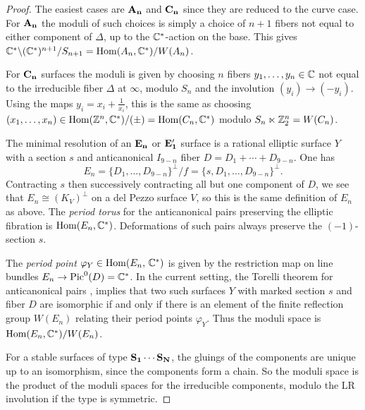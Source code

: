 \documentclass[table,x11names]{amsart}
\begin{document}
\begin{proof} The easiest cases are ${\bf A_n}$ and ${\bf C_n}$ since they are
  reduced to the curve case.
  For ${\bf A_n}$ the
  moduli of such choices is simply a choice of $n+1$ fibers not equal
  to either component of $\Delta$, up to the $\mathbb{C}^*$-action on the
  base. This gives ${\mathbb C}^*\backslash ({\mathbb C}^*)^{n+1} / S_{n+1}= \operatorname{Hom}(A_n,{\mathbb C}^*) /
  W(A_n)$. 

  For ${\bf C_n}$ surfaces the moduli is given by choosing
  $n$ fibers $y_1,\dotsc, y_n\in{\mathbb C}$ not equal to the irreducible
  fiber $\Delta$ at $\infty$, modulo $S_n$ and the involution
  $(y_i)\to (-y_i)$. Using the maps $y_i = x_i + \frac1{x_i}$, this is
  the same as choosing
  $(x_1, \dotsc, x_n) \in \operatorname{Hom}({\mathbb Z}^n,{\mathbb C}^*) / (\pm) = \operatorname{Hom}(C_n,
  {\mathbb C}^*)$ modulo $S_n\ltimes{\mathbb Z}_2^n = W(C_n)$.

  The minimal resolution of an ${\bf E_n}$ or ${\bf E_1'}$ surface is a
  rational elliptic surface $Y$ with a section $s$ and anticanonical
  $I_{9-n}$ fiber $D= D_1+\cdots + D_{9-n}$.  One has
  \begin{displaymath}
  E_n=\{D_1,\dots,D_{9-n}\}^\perp/f = \{s,D_1,\dots,D_{9-n}\}^\perp.
  \end{displaymath}
  Contracting $s$ then
  successively contracting all but one component of $D$, we see that
  $E_n\cong (K_V)^\perp$ on a del Pezzo surface $V$, so this is the
  same definition of $E_n$ as above.  
  The \emph{period torus} for the anticanonical pairs preserving the
  elliptic fibration is $\operatorname{Hom}(E_n, {\mathbb C}^*)$. 
  Deformations of such pairs always preserve the $(-1)$-section
  $s$. 

  The {\it period point} $\varphi_Y\in \operatorname{Hom}(E_n,\,\mathbb{C}^*)$ is given by
  the restriction map on line bundles $E_n \to \operatorname{Pic}^0(D)= \mathbb{C}^*$.  In
  the current setting, the Torelli theorem for anticanonical pairs
  \cite[Thm.1.8]{gross2015moduli-of-surfaces},
  \cite[Thm.8.7]{friedman2015on-the-geometry} implies that two such
  surfaces $Y$ with marked section $s$ and fiber $D$ are isomorphic if
  and only if there is an element of the finite reflection group
  $W(E_n)$ relating their period points $\varphi_Y$. Thus the moduli
  space is $\operatorname{Hom}(E_n ,\mathbb{C}^*)/ W(E_n)$.

  For a stable surfaces of type ${\bf S_1\cdots S_N}$, the
  gluings of the components are unique up to an isomorphism, since the
  components form a chain. So the moduli space is the product of the
  moduli spaces for the irreducible components, modulo the LR
  involution if the type is symmetric.
\end{proof}
 
\end{document}
